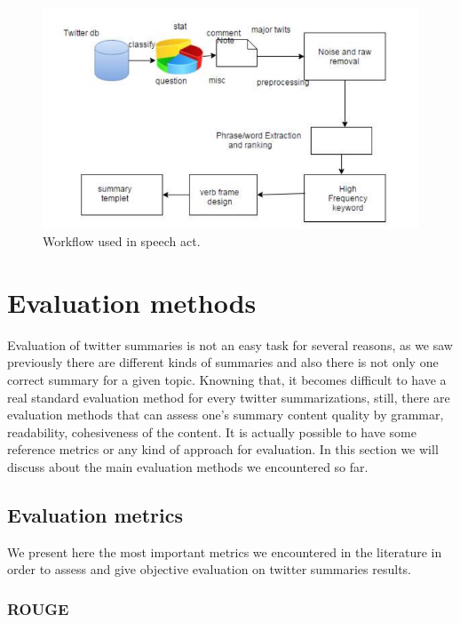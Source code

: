 \documentclass[runningheads]{llncs}
\begin{document}
\begin{figure}[H]
    \includegraphics[width=\textwidth]{fig8.png}
    \caption{Workflow used in speech act.}
    \label{fig:fig8}
\end{figure}

\section{Evaluation methods}

Evaluation of twitter summaries is not an easy task for several reasons, as we
saw previously there are different kinds of summaries and also there is not
only one correct summary for a given topic. Knowning that, it becomes
difficult to have a real standard evaluation method for every twitter
summarizations, still, there are evaluation methods that can assess one's
summary content quality by grammar, readability, cohesiveness of the content.
It is actually possible to have some reference metrics or any kind of approach
for evaluation. In this section we will discuss about the main evaluation
methods we encountered so far.

\subsection{Evaluation metrics}

We present here the most important metrics we encountered in the literature in
order to assess and give objective evaluation on twitter summaries results.

\subsubsection{ROUGE}
\end{document}
